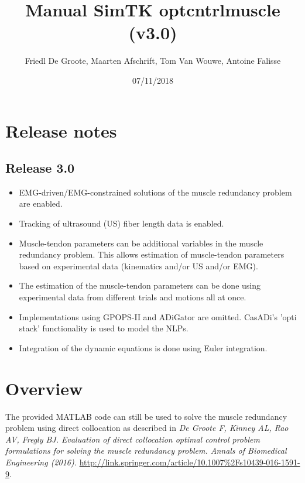 \documentclass[a4paper,oneside,11pt]{article}
\begin{document}
\title{Manual SimTK optcntrlmuscle (v3.0)}
\author{Friedl De Groote, Maarten Afschrift, Tom Van Wouwe, Antoine Falisse}
\date{07/11/2018} 
\maketitle
\tableofcontents

\section{Release notes}

\subsection{Release 3.0}
\begin{itemize}
	\item EMG-driven/EMG-constrained solutions of the muscle redundancy problem are enabled.
	\item Tracking of ultrasound (US) fiber length data is enabled.
	\item Muscle-tendon parameters can be additional variables in the muscle redundancy problem. This allows estimation of muscle-tendon parameters based on experimental data (kinematics and/or US and/or EMG).
	\item The estimation of the muscle-tendon parameters can be done using experimental data from different trials and motions all at once.
	\item Implementations using GPOPS-II and ADiGator are omitted. CasADi's 'opti stack' functionality is used to model the NLPs.
	\item Integration of the dynamic equations is done using Euler integration.
\end{itemize}


\section{Overview}
\label{Overview}

The provided MATLAB code can still be used to solve the muscle redundancy problem using direct collocation as described in \textit{De Groote F, Kinney AL, Rao AV, Fregly BJ. Evaluation of direct collocation optimal control problem formulations for solving the muscle redundancy problem. Annals of Biomedical Engineering (2016).} \url{http://link.springer.com/article/10.1007%2Fs10439-016-1591-9}. 
\\
\end{document}
